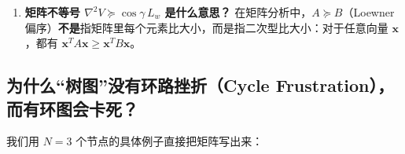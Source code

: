 \documentclass[UTF8, a4paper, 11pt]{ctexart}
\begin{document}
\begin{mathprep}
\begin{enumerate}[label=\textbf{\arabic*.}]
    \textbf{菲德勒定理（Fiedler's Theorem）}：当且仅当该图是\textbf{连通图}（没有任何孤立子图）时，第二小特征值严格大于零：
    \[
        \boxed{\lambda_2(L_w) > 0.}
    \]
    并且，对于任何消除了公共相位漂移的相对向量 $\bm{x}$（即满足 $\bm{x} \perp \bm{1}$，亦即 $\sum_{i=1}^N x_i = 0$），都有瑞利商下界（Rayleigh Quotient Bound）：
    \[
        \bm{x}^T L_w \bm{x} \ge \lambda_2(L_w) \|\bm{x}\|^2.
    \]
    \item \textbf{矩阵不等号 $\nabla^2 V \succeq \cos\gamma\, L_w$ 是什么意思？}
    在矩阵分析中，$A \succeq B$（Loewner 偏序）\textbf{不是}指矩阵里每个元素比大小，而是指二次型比大小：对于任意向量 $\bm{x}$，都有 $\bm{x}^T A \bm{x} \ge \bm{x}^T B \bm{x}$。
\end{enumerate}
\end{mathprep}

\subsection{为什么“树图”没有环路挫折（Cycle Frustration），而有环图会卡死？}

我们用 $N=3$ 个节点的具体例子直接把矩阵写出来：
\end{document}
